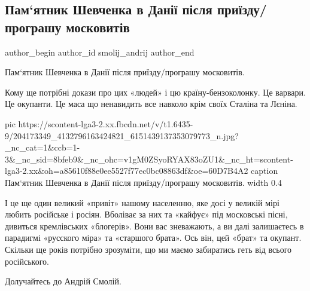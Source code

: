  
 
 
 
 
 
\subsection{Пам‘ятник Шевченка в Данії після приїзду/програшу московитів}
\label{sec:22_06_2021.fb.smolij_andrij.1.shevchenko_pamjatnik_dania}
\ifcmt
 author_begin
   author_id smolij_andrij
 author_end
\fi

Пам‘ятник Шевченка в Данії після приїзду/програшу московитів. 

Кому ще потрібні докази про цих «людей» і цю країну-бензоколонку. Це варвари.
Це окупанти. Це маса що ненавидить все навколо крім своїх Сталіна та Лєніна.

\ifcmt
  pic https://scontent-lga3-2.xx.fbcdn.net/v/t1.6435-9/204173349_4132796163424821_6151439137353079773_n.jpg?_nc_cat=1&ccb=1-3&_nc_sid=8bfeb9&_nc_ohc=v1gM0ZSyoRYAX83oZU1&_nc_ht=scontent-lga3-2.xx&oh=a85610f88e0ee5527f77ec0bc08863df&oe=60D7B4A2
	caption Пам‘ятник Шевченка в Данії після приїзду/програшу московитів. 
	width 0.4
\fi

І це ще один великий «привіт» нашому населенню, яке досі у великій мірі любить
російське і росіян. Вболіває за них та «кайфує» під московські пісні, дивиться
кремлівських «блогерів». Вони вас зневажають, а ви далі залишаєтесь в парадигмі
«русского міра» та «старшого брата». Ось він, цей «брат» та окупант. Скільки ще
років потрібно зрозуміти, що ми маємо забиратись геть від всього російського.

Долучайтесь до Андрій Смолій.




